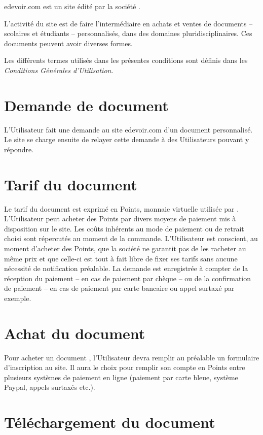 edevoir.com est un site édité par la société \eDevoir.

L'activité du site est de faire l'intermédiaire en achats et ventes de documents -- scolaires et étudiants -- personnalisés, dans des domaines pluridisciplinaires. Ces documents peuvent avoir diverses formes.

Les différents termes utilisés dans les présentes conditions sont définis dans les \textit{Conditions Générales d'Utilisation}.

\section{Demande de document}

L'Utilisateur fait une demande au site edevoir.com d'un document personnalisé. Le site se charge ensuite de relayer cette demande à des Utilisateurs pouvant y répondre.

\section{Tarif du document}

Le tarif du document est exprimé en Points, monnaie virtuelle utilisée par \eDevoir. L'Utilisateur peut acheter des Points par divers moyens de paiement mis à disposition sur le site. Les coûts inhérents au mode de paiement ou de retrait choisi sont répercutés au moment de la commande. L'Utilisateur est conscient, au moment d'acheter des Points, que la société \eDevoir ne garantit pas de les racheter au même prix et que celle-ci est tout à fait libre de fixer ses tarifs sans aucune nécessité de notification préalable.
La demande est enregistrée à compter de la réception du paiement -- en cas de paiement par chèque -- ou de la confirmation de paiement -- en cas de paiement par carte bancaire ou appel surtaxé par exemple.

\section{Achat du document}

Pour acheter un document , l'Utilisateur devra remplir au préalable un formulaire d'inscription au site. Il aura le choix pour remplir son compte en Points entre plusieurs systèmes de paiement en ligne (paiement par carte bleue, système Paypal, appels surtaxés etc.).

\section{Téléchargement du document}

